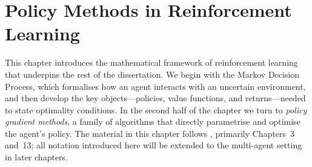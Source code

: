 
\chapter{Policy Methods in Reinforcement Learning}
\label{ch:policy-methods}

This chapter introduces the mathematical framework of reinforcement learning that underpins the rest of the dissertation. We begin with the Markov Decision Process, which formalises how an agent interacts with an uncertain environment, and then develop the key objects---policies, value functions, and returns---needed to state optimality conditions. In the second half of the chapter we turn to \emph{policy gradient methods}, a family of algorithms that directly parametrise and optimise the agent's policy. The material in this chapter follows \cite{sutton2018rl}, primarily Chapters~3 and~13; all notation introduced here will be extended to the multi-agent setting in later chapters.










